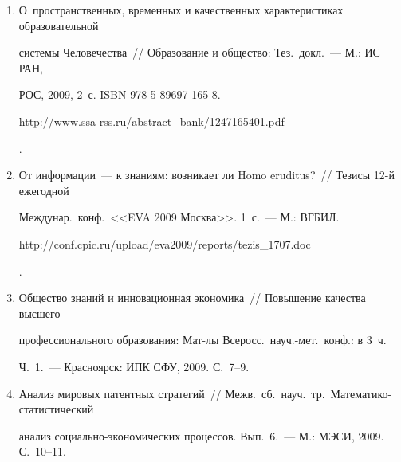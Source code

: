 \begin{enumerate}[1.]
2009. Abstracts).~--- M.: Институт Африки РАН, 2009. 


С.~117-118. {\sf http://cliodynamics.ru/\linebreak index.php?option=com\_content\&task=view\&id=153};   


{\sf http://\linebreak old.uchitel-izd.ru/files/journals/Tezisy.doc}.





\item{}


О~пространственных, временных и качественных характеристиках образовательной 


системы Человечества~// Образование и общество: Тез.\ докл.~--- М.: ИС РАН, 


РОС, 2009, 2~с. ISBN 978-5-89697-165-8. {\sf 


http://\linebreak www.ssa-rss.ru/abstract\_bank/1247165401.pdf}.





\item {}


От информации~--- к знаниям: возникает ли Homo eruditus?~// Тезисы 12-й ежегодной 


Междунар.\ конф.\ <<EVA 2009 Москва>>. 1~с.~--- М.: ВГБИЛ. {\sf 


http://conf.cpic.ru/\linebreak upload/eva2009/reports/tezis\_1707.doc}.





\item {}


Общество знаний и инновационная экономика~// Повышение качества высшего 


профессионального образования: Мат-лы Всеросс.\ науч.-мет.\ конф.: в 3~ч. 


Ч.~1.~--- Красноярск: ИПК СФУ, 2009. С.~7--9.





\item {}


Анализ мировых патентных стратегий~// Межв.\ сб.\ науч.\ тр.\ Ма\-те\-ма\-ти\-ко-ста\-ти\-сти\-че\-ский 


анализ социально-экономических процессов. Вып.~6.~--- М.: МЭСИ, 2009. С.~10--11.






\end{enumerate}
